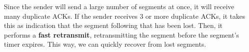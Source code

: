\documentclass[12pt,letterpaper]{amsbook}
\theoremstyle{definition}
\begin{document}
Since the sender will send a large number of segments at once, it will receive many duplicate ACKs. If the sender receives 3 or more duplicate ACKs, it takes this as indication that the segment following that has been lost. Then, it performs a \textbf{fast retransmit}, retransmitting the segment before the segment's timer expires. This way, we can quickly recover from lost segments.
\end{document}
